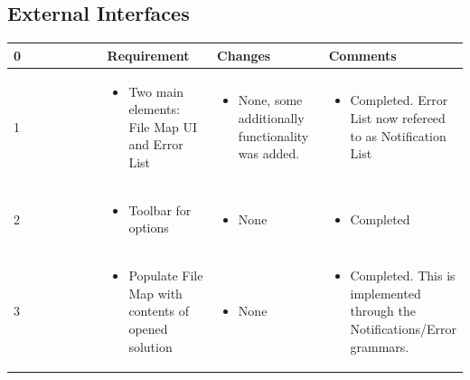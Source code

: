 \documentclass[letterpaper,10pt,titlepage,draftclsnofoot,onecolumn,onesided] {IEEEtran}
\begin{document}
\subsection{External Interfaces}
\small{
\begin{center}
	\begin{singlespace}
		\begin{tabular}{ |  p{0.25\linewidth}  |  p{0.25\linewidth}  | p{0.25\linewidth} | p{0.25\linewidth} |}
		\hline
		0 & Requirement & Changes & Comments \\ \hline
		
			1
		& 
			\begin{itemize}
				\item Two main elements: File Map UI and Error List
			\end{itemize}
		& 
			\begin{itemize}
				\item None, some additionally functionality was added.
			\end{itemize}
		&
			\begin{itemize}
				\item Completed. Error List now refereed to as Notification List
			\end{itemize} 
		
        \\ \hline

			2
		& 
			\begin{itemize}
				\item Toolbar for options
			\end{itemize}
		& 
			\begin{itemize}
				\item None
			\end{itemize}
		&
			\begin{itemize}
				\item Completed
			\end{itemize} 
		
        \\ \hline

            3
		& 
			\begin{itemize}
				\item Populate File Map with contents of opened solution
			\end{itemize}
		& 
			\begin{itemize}
				\item None
			\end{itemize}
		&
			\begin{itemize}
				\item Completed. This is implemented through the Notifications/Error grammars.
			\end{itemize} 
		

\end{tabular}
\end{singlespace}
\end{center}}
\end{document}
